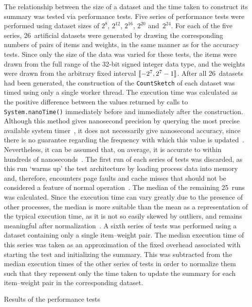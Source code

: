 The relationship between the size of a dataset and the time taken to construct its summary was tested via performance tests.
Five series of performance tests were performed using dataset sizes of \( 2^{8} \), \( 2^{12} \), \( 2^{16} \), \( 2^{20} \) and~\( 2^{24} \).
For each of the five series, \num{26}~artificial datasets were generated by drawing the corresponding numbers of pairs of items and weights, in the same manner as for the accuracy tests.
Since only the size of the data was varied for these tests, the items were drawn from the full range of the \num{32}-bit signed integer data type, and the weights were drawn from the arbitrary fixed interval \( \llbracket-2^{7}, 2^{7} - 1\rrbracket \).
After all \num{26}~datasets had been generated, the construction of the \lstinline{CountSketch} of each dataset was timed using only a single worker thread.
The execution time was calculated as the positive difference between the values returned by calls to \lstinline{System.nanoTime()} immediately before and immediately after the construction.
Although this method gives nanosecond precision by querying the most precise available system timer~\citep{o14}, it does not necessarily give nanosecond accuracy, since there is no guarantee regarding the frequency with which this value is updated~\citep{lambert08}.
Nevertheless, it can be assumed that, on average, it is accurate to within hundreds of nanoseconds~\citep{kuperberg09}.
The first run of each series of tests was discarded, as this run `warms up' the test architecture by loading process data into memory and, therefore, encounters page faults and cache misses that should not be considered a feature of normal operation~\citep{luo04}.
The median of the remaining \num{25}~runs was calculated.
Since the execution time can vary greatly due to the presence of other processes, the median is more suitable than the mean as a representation of the typical execution time, as it is not so easily skewed by outliers, and remains meaningful after normalization~\citep{fleming86}.
A sixth series of tests was performed using a dataset containing only a single item--weight pair.
The median execution time of this series was taken as an approximation of the fixed overhead associated with starting the test and initializing the summary.
This was subtracted from the median execution times of the other series of tests in order to normalize them such that they represent only the time taken to update the summary for each item--weight pair in the corresponding dataset.

\begin{table}
  \centering
  \caption{Results of the performance tests}
  \label{tab:count-sketch-implementation-performance}
\end{table}

